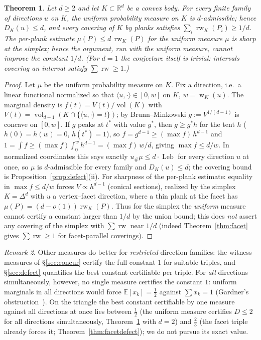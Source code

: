 \documentclass[11pt,reqno]{amsart}
\theoremstyle{plain}
\newtheorem{theorem}{Theorem}[section]
\theoremstyle{definition}
\theoremstyle{remark}
\newtheorem{remark}[theorem]{Remark}
\newcommand{\rw}{\operatorname{rw}}
\newcommand{\Leb}{\operatorname{Leb}}
\newcommand{\R}{\mathbb{R}}
\DeclareMathOperator{\wid}{w}
\DeclareMathOperator{\vol}{vol}
\begin{document}
\begin{theorem}\label{thm:oned}
Let $d\ge2$ and let $K\subset\R^d$ be a convex body. For \emph{every} finite
family of directions $u$ on $K$, the uniform probability measure on $K$ is
$d$-admissible; hence $D_K(u)\le d$, and every covering of $K$ by planks
satisfies $\sum_i\rw_K(P_i)\ge 1/d$. The per-plank estimate
$\mu(P)\le d\,\rw_K(P)$ for the uniform measure $\mu$ is sharp at the simplex;
hence the argument, run with the uniform measure, cannot improve the constant
$1/d$. (For $d=1$ the conjecture itself is trivial: intervals covering an
interval satisfy $\sum\rw\ge1$.)
\end{theorem}
\begin{proof}
Let $\mu$ be the uniform probability measure on $K$. Fix a direction, i.e.\ a
linear functional normalized so that $\langle u,\cdot\rangle\in[0,w]$ on $K$,
$w=\wid_K(u)$. The marginal density is
$f(t)=V(t)/\vol(K)$ with $V(t)=\vol_{d-1}(K\cap\{\langle u,\cdot\rangle=t\})$; by
Brunn--Minkowski $g:=V^{1/(d-1)}$ is concave on $[0,w]$. If $g$ peaks at $t^\ast$
with value $g^\ast$, then $g\ge g^\ast h$ for the tent $h$ ($h(0)=h(w)=0$,
$h(t^\ast)=1$), so $f=g^{d-1}\ge(\max f)\,h^{d-1}$ and
$1=\int f\ge(\max f)\int_0^w h^{d-1}=(\max f)\,w/d$, giving $\max f\le d/w$. In
normalized coordinates this says exactly $u_{\#}\mu\le d\cdot\Leb$ for every
direction $u$ at once, so $\mu$ is $d$-admissible for every family and
$D_K(u)\le d$; the covering bound is Proposition~\ref{prop:defect}(ii). For
sharpness of the per-plank estimate: equality in $\max f\le d/w$ forces
$V\propto h^{d-1}$ (conical sections),
realized by the simplex $K=\Delta^d$ with $u$ a vertex--facet direction, where a
thin plank at the facet has $\mu(P)=(d-o(1))\rw_K(P)$. Thus for the simplex the
\emph{uniform} measure cannot certify a constant larger than $1/d$ by the union
bound; this does \emph{not} assert any covering of the simplex with
$\sum\rw$ near $1/d$ (indeed Theorem~\ref{thm:facet} gives $\sum\rw\ge1$ for
facet-parallel coverings).
\end{proof}
\begin{remark}\label{rem:oneall}
Other measures do better for \emph{restricted} direction families: the witness
measures of \S\ref{sec:concur} certify the full constant $1$ for suitable triples,
and \S\ref{sec:defect} quantifies the best constant certifiable per triple. For
\emph{all} directions simultaneously, however, no single measure certifies the
constant $1$: uniform marginals in all directions would force
$\mathbb E[x_k]=\tfrac12$ against $\sum x_k=1$ (Gardner's
obstruction~\cite{Gardner88}). On the triangle the best constant certifiable by
one measure against all directions at once lies between $\tfrac12$ (the uniform
measure certifies $D\le2$ for all directions simultaneously,
Theorem~\ref{thm:oned} with $d=2$) and $\tfrac23$ (the facet triple
already forces it; Theorem~\ref{thm:facetdefect}); we do not pursue its exact
value.
\end{remark}
\end{document}

